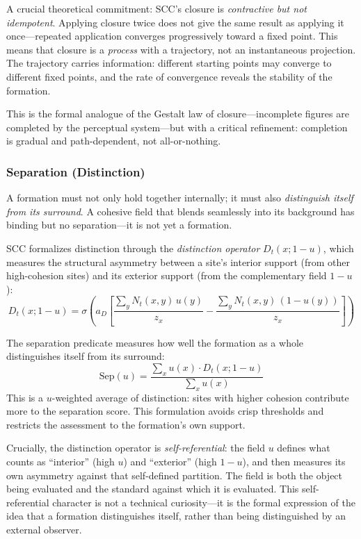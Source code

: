 \documentclass[lettersize,journal]{IEEEtran}
\begin{document}
A crucial theoretical commitment: SCC's closure is \emph{contractive but not idempotent}. Applying closure twice does not give the same result as applying it once---repeated application converges progressively toward a fixed point. This means that closure is a \emph{process} with a trajectory, not an instantaneous projection. The trajectory carries information: different starting points may converge to different fixed points, and the rate of convergence reveals the stability of the formation.

This is the formal analogue of the Gestalt law of closure---incomplete figures are completed by the perceptual system---but with a critical refinement: completion is gradual and path-dependent, not all-or-nothing.

\subsubsection{Separation (Distinction)}

A formation must not only hold together internally; it must also \emph{distinguish itself from its surround}. A cohesive field that blends seamlessly into its background has binding but no separation---it is not yet a formation.

SCC formalizes distinction through the \emph{distinction operator} $D_t(x; 1-u)$, which measures the structural asymmetry between a site's interior support (from other high-cohesion sites) and its exterior support (from the complementary field $1-u$):
\begin{equation}
D_t(x; 1-u) = \sigma\!\left(a_D\!\left[\frac{\textstyle\sum_y N_t(x,y)\,u(y)}{\textstyle z_x} - \frac{\textstyle\sum_y N_t(x,y)\,(1-u(y))}{\textstyle z_x}\right]\right)
\end{equation}

The separation predicate measures how well the formation as a whole distinguishes itself from its surround:
\begin{equation}
\text{Sep}(u) = \frac{\sum_x u(x) \cdot D_t(x; 1-u)}{\sum_x u(x)}
\end{equation}
This is a $u$-weighted average of distinction: sites with higher cohesion contribute more to the separation score. This formulation avoids crisp thresholds and restricts the assessment to the formation's own support.

Crucially, the distinction operator is \emph{self-referential}: the field $u$ defines what counts as ``interior'' (high $u$) and ``exterior'' (high $1-u$), and then measures its own asymmetry against that self-defined partition. The field is both the object being evaluated and the standard against which it is evaluated. This self-referential character is not a technical curiosity---it is the formal expression of the idea that a formation distinguishes itself, rather than being distinguished by an external observer.
\end{document}

